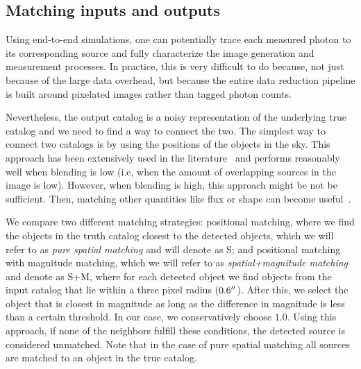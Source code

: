 \documentclass[twocolumn]{aastex62}
\begin{document}
\subsection{Matching inputs and outputs}
\label{ssec:matching}

Using end-to-end simulations, one can potentially trace each measured photon to its corresponding source and fully characterize the image generation and measurement processes. In practice, this is very difficult to do because, not just because  of the large data overhead, but because the entire data reduction pipeline is built around pixelated images rather than tagged photon counts.

Nevertheless, the output catalog is a noisy representation of the underlying true catalog and we need to find a way to connect the two. 
The simplest way to connect two catalogs is by using the positions of the objects in the sky. This approach has been extensively used in the literature~\citep{1977A&AS...28..211D,1983Obs...103..150B,1986MNRAS.223..279W} and performs reasonably well when blending is low (i.e, when the amount of overlapping sources in the image is low). However, when blending is high, this approach might be not be sufficient. Then, matching other quantities like flux or shape can become useful~\citep{2008ApJ...679..301B}.

We compare two different matching strategies: positional matching, where we find the objects in the truth catalog closest to the detected objects, which we will refer to as \textit{pure spatial matching} and will denote as \textsf{S}; and positional matching with magnitude matching, which we will refer to as \textit{spatial+magnitude matching} and denote as \textsf{S+M}, where for each detected object we find objects from the input catalog that lie within a three pixel radius ($0.6 \mbox{$^{\prime\prime}$}$). After this, we select the object that is closest in magnitude as long as the difference in magnitude is less than a certain threshold. In our case, we conservatively choose $1.0$. Using this approach, if none of the neighbors fulfill these conditions, the detected source is considered unmatched. Note that in the case of pure spatial matching all sources are matched to an object in the true catalog.
\end{document}
